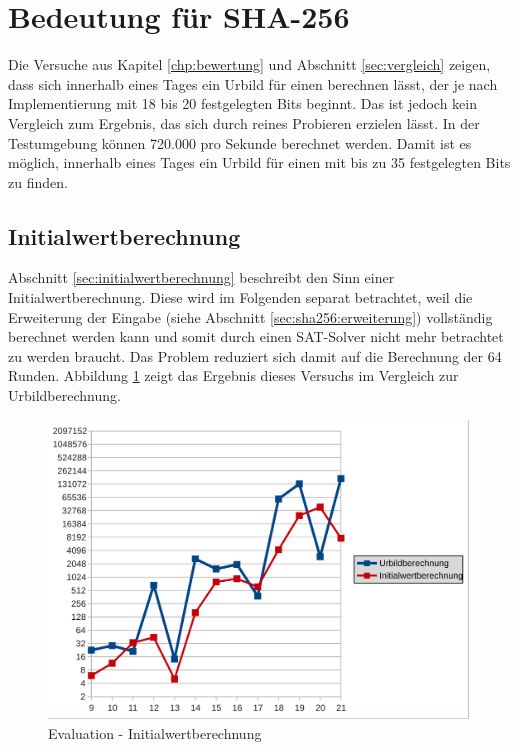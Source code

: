 \section{Bedeutung für SHA-256}

Die Versuche aus Kapitel \ref{chp:bewertung} und Abschnitt \ref{sec:vergleich} zeigen, dass sich innerhalb eines Tages
ein Urbild für einen  berechnen lässt, der je nach Implementierung mit 18 bis 20 festgelegten Bits beginnt. Das ist jedoch
kein Vergleich zum Ergebnis, das sich durch reines Probieren erzielen lässt. In der Testumgebung können 720.000  pro Sekunde
berechnet werden. Damit ist es möglich, innerhalb eines Tages ein Urbild für einen  mit bis zu 35 festgelegten Bits zu finden.

\subsection{Initialwertberechnung}
Abschnitt \ref{sec:initialwertberechnung} beschreibt den Sinn einer Initialwertberechnung. Diese wird im Folgenden separat
betrachtet, weil die Erweiterung der Eingabe (siehe Abschnitt \ref{sec:sha256:erweiterung}) vollständig berechnet werden kann
und somit durch einen SAT-Solver nicht mehr betrachtet zu werden braucht. Das Problem reduziert sich damit auf die Berechnung
der 64 Runden. Abbildung \ref{fig:eval_initial} zeigt das Ergebnis dieses Versuchs im Vergleich zur Urbildberechnung.
\begin{figure}[!h]
  \centering
  \includegraphics[scale=0.55]{images/eval_initial}
  \caption{Evaluation - Initialwertberechnung}
  \label{fig:eval_initial}
\end{figure}


